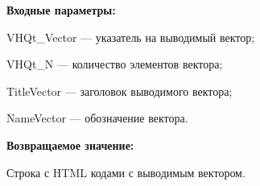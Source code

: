 \textbf{Входные параметры:}

VHQt\_Vector --- указатель на выводимый вектор;
 
    VHQt\_N --- количество элементов вектора;
 
    TitleVector --- заголовок выводимого вектора;
 
    NameVector --- обозначение вектора.

\textbf{Возвращаемое значение:}

Строка с HTML кодами с выводимым вектором.